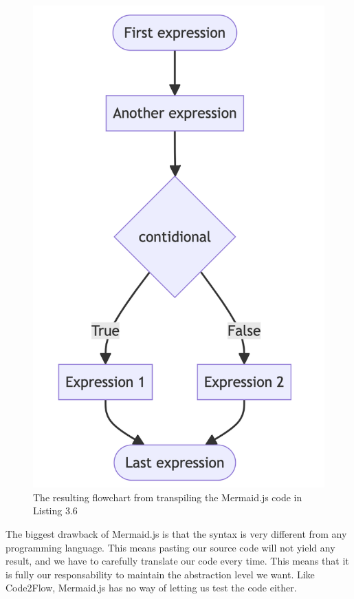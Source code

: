 \begin{figure}[ht]
    \centering
    \includegraphics[scale=.5]{assets/mermaidjs.png}
    \caption{The resulting flowchart from transpiling the Mermaid.js code in Listing 3.6}
    \label{fig:code2flow}
\end{figure}

The biggest drawback of Mermaid.js is that the syntax is very different from any programming language. This means pasting our source code will not yield any result, and we have to carefully translate our code every time. This means that it is fully our responsability to maintain the abstraction level we want. Like Code2Flow, Mermaid.js has no way of letting us test the code either.
